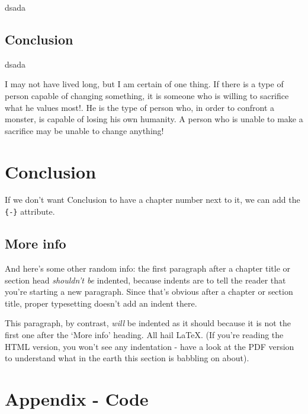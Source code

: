 \documentclass[a4paper, nobind]{templates/cdethesis}
\begin{document}
dsada

\hypertarget{conclusion}{%
\section{Conclusion}\label{conclusion}}

dsada

\begin{savequote}
I may not have lived long, but I am certain of one thing. If there is a
type of person capable of changing something, it is someone who is
willing to sacrifice what he values most!. He is the type of person who,
in order to confront a monster, is capable of losing his own humanity. A
person who is unable to make a sacrifice may be unable to change
anything!
\end{savequote}



\hypertarget{conclusion-1}{%
\chapter*{Conclusion}\label{conclusion-1}}

If we don't want Conclusion to have a chapter number next to it, we can add the \texttt{\{-\}} attribute.

\hypertarget{more-info}{%
\section*{More info}\label{more-info}}

And here's some other random info:
the first paragraph after a chapter title or section head \emph{shouldn't be} indented, because indents are to tell the reader that you're starting a new paragraph.
Since that's obvious after a chapter or section title, proper typesetting doesn't add an indent there.

This paragraph, by contrast, \emph{will} be indented as it should because it is not the first one after the `More info' heading.
All hail LaTeX. (If you're reading the HTML version, you won't see any indentation - have a look at the PDF version to understand what in the earth this section is babbling on about).

\startappendices

\hypertarget{appendix---code}{%
\chapter{Appendix - Code}\label{appendix---code}}
\end{document}
